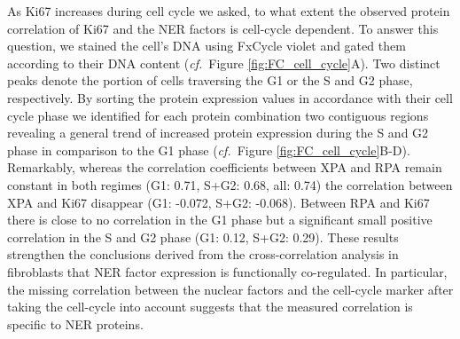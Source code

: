 As Ki67 increases during cell cycle we asked, to what extent the observed protein correlation of Ki67 and the NER factors is cell-cycle dependent. To answer this question, we stained the cell's DNA using FxCycle violet and gated them according to their DNA content (\textit{cf.}\ Figure \ref{fig:FC_cell_cycle}A). Two distinct peaks denote the portion of cells traversing the G1 or the S and G2 phase, respectively. By sorting the protein expression values in accordance with their cell cycle phase we identified for each protein combination two contiguous regions revealing a general trend of increased protein expression during the S and G2 phase in comparison to the G1 phase (\textit{cf.}\ Figure \ref{fig:FC_cell_cycle}B-D).\\
Remarkably, whereas the correlation coefficients between XPA and RPA remain constant in both regimes (G1: 0.71, S+G2: 0.68, all: 0.74) the correlation between XPA and Ki67 disappear (G1: -0.072, S+G2: -0.068). Between RPA and Ki67 there is close to no correlation in the G1 phase but a significant small positive correlation in the S and G2 phase (G1: 0.12, S+G2: 0.29). These results strengthen the conclusions derived from the cross-correlation analysis in fibroblasts that NER factor expression is functionally co-regulated. In particular, the missing correlation between the nuclear factors and the cell-cycle marker after taking the cell-cycle into account suggests that the measured correlation is specific to NER proteins. 





